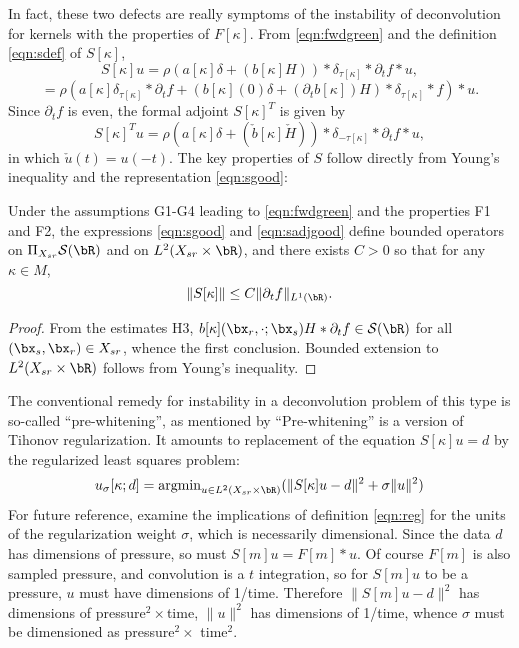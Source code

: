 In fact, these two defects are really symptoms of the instability of
deconvolution for kernels with the properties of $F[\kappa]$.  From \ref{eqn:fwdgreen} and the
definition \ref{eqn:sdef} of  $S[\kappa]$,
\[
  S[\kappa]u = \rho( a[\kappa]\delta    +  (b[\kappa]H)) *\delta_{\tau[\kappa]}*\partial_t f *u,
\]
\begin{equation}
  \label{eqn:sgood}
  = \rho(a[\kappa]\delta_{\tau[\kappa]}*\partial_t f +
  (b[\kappa](0)\delta + (\partial_t b[\kappa])H)
  *\delta_{\tau[\kappa]}*f) * u.
\end{equation}
Since $\partial_t f$ is even, the formal adjoint $S[\kappa]^T$ is given by
\begin{equation}
  \label{eqn:sadjgood}
  S[\kappa]^Tu = \rho( a[\kappa]\delta    +  (\check{b}[\kappa]\check{H}))
  *\delta_{-\tau[\kappa]}*\partial_t f *u,
\end{equation}
in which $\check{u}(t) = u(-t)$.
The key properties of $S$ follow directly from Young's inequality and
the representation \ref{eqn:sgood}:
\begin{lemma}
  \label{thm:snorm}
  Under the assumptions G1-G4 leading to \ref{eqn:fwdgreen} and
  the properties F1 and F2, the expressions \ref{eqn:sgood} and \ref{eqn:sadjgood} define 
  bounded operators on
  $\Pi_{X_{sr}} {\cal S}(\bR)$ and on
  $L^2(X_{sr} \times \bR)$, and there exists $C>0$ so
  that for any $\kappa \in M$,
  \begin{equation}
    \label{eqn:snorm}
    \|S[\kappa]\| \le C\|\partial_t f\|_{L^1(\bR)}.
  \end{equation}
\end{lemma}
\begin{proof} From the estimates H3, $b[\kappa](\bx_r,\cdot;\bx_s)H *
  \partial_tf \in {\cal S}(\bR)$ for all $(\bx_s,\bx_r) \in X_{sr}$,
  whence the first conclusion. Bounded extension to $L^2(X_{sr} \times
  \bR)$ follows from Young's inequality.
\end{proof}
  
The conventional remedy for instability in a deconvolution problem of
this type is so-called ``pre-whitening'', as
mentioned by \cite{Warner:16} ``Pre-whitening'' is a version of
Tihonov regularization. It  amounts to replacement of the equation
$S[\kappa]u=d$ by the regularized least squares problem: 
\begin{equation}
  \label{eqn:reg}
  u_{\sigma}[\kappa;d] = \mbox{argmin}_{u \in L^2(X_{sr} \times \bR)} (\|S[\kappa]u-d\|^2 + \sigma\|u\|^2)
\end{equation}
For future reference, examine the
implications of definition \ref{eqn:reg} for the units of the regularization weight $\sigma$,
which  is
necessarily dimensional. Since the data $d$ has dimensions of
pressure, so must $S[m]u = F[m]*u$. Of course $F[m]$ is also sampled
pressure, and convolution is a $t$ integration, so for $S[m]u$ to be a
pressure, $u$ must have dimensions of 1/time. Therefore
$\|S[m]u-d\|^2$ has dimensions of pressure$^2 \times $time, $\|u\|^2$ has
dimensions of 1/time, whence $\sigma$ must be dimensioned as
pressure$^2 \times$  time$^2$.

